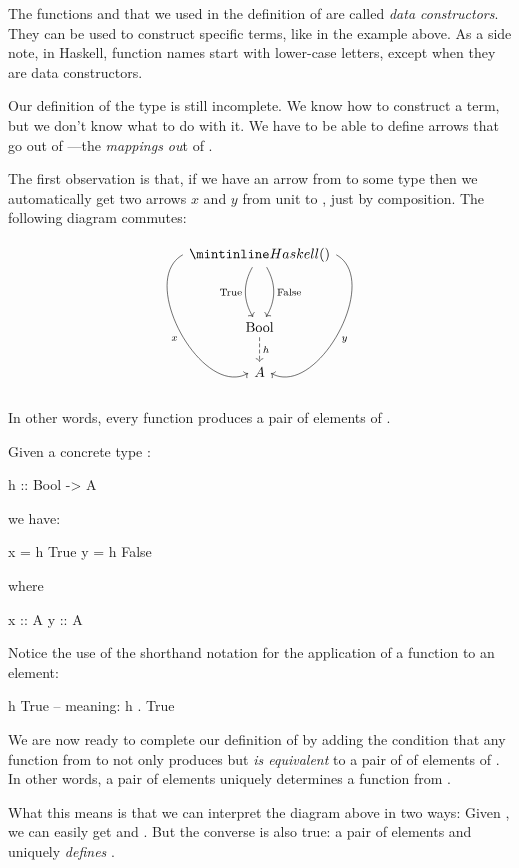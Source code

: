 \documentclass[DaoFP]{subfiles}
\begin{document}
The functions  and  that we used in the definition of  are called \emph{data constructors}. They can be used to construct specific terms, like in the example above. As a side note, in Haskell, function names start with lower-case letters, except when they are data constructors. 

Our definition of the type  is still incomplete. We know how to construct a  term, but we don't know what to do with it. We have to be able to define arrows that go out of ---the \emph{mappings ou}t of . 

The first observation is that, if we have an arrow  from  to some type  then we automatically get two arrows $x$ and $y$ from unit to , just by composition. The following diagram commutes:

\[
 \begin{tikzcd}
 \hask{()}
 \arrow[dd, bend right, "\text{True}"']
 \arrow[dd, bend left, "\text{False}"]
  \arrow[ddd, bend right =90, "x"']
 \arrow[ddd, bend left=90, "y"]
\\
 \\
\text{Bool}
\arrow[d, dashed, "h"]
\\
A
 \end{tikzcd}
\]
In other words, every function  produces a pair of elements of .

Given a concrete type :
\begin{haskell}
h :: Bool -> A
\end{haskell}
we have:
\begin{haskell}
x = h True
y = h False
\end{haskell}
where
\begin{haskell}
x :: A
y :: A
\end{haskell}
Notice the use of the shorthand notation for the application of a function to an element:
\begin{haskell}
h True -- meaning: h . True
\end{haskell}

We are now ready to complete our definition of  by adding the condition that any function from  to  not only produces but \emph{is equivalent} to a pair of of elements of . In other words, a pair of elements uniquely determines a function from . 

What this means is that we can interpret the diagram above in two ways: Given , we can easily get  and . But the converse is also true: a pair of elements  and  uniquely \emph{defines} .
\end{document}
